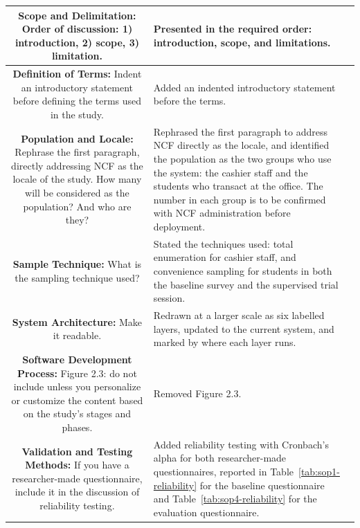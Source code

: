 \documentclass[12pt,letterpaper]{article}
\newcommand{\pg}[1]{\large #1}
\begin{document}
\begin{longtable}{|S|A|P|}
\textbf{Scope and Delimitation:}\newline
Order of discussion: 1) introduction, 2) scope, 3) limitation.
&
Presented in the required order: introduction, scope, and limitations.
&
\pg{\pageref{sec:scope}} \\ \hline

\textbf{Definition of Terms:}\newline
Indent an introductory statement before defining the terms used in the
study.
&
Added an indented introductory statement before the terms.
&
\pg{\pageref{cr:definitions}} \\ \hline

\textbf{Population and Locale:}\newline
Rephrase the first paragraph, directly addressing NCF as the locale of
the study. How many will be considered as the population? And who are
they?
&
Rephrased the first paragraph to address NCF directly as the locale, and
identified the population as the two groups who use the system: the
cashier staff and the students who transact at the office. The number
in each group is to be confirmed with NCF administration before
deployment.
&
\pg{\pageref{cr:population}} \\ \hline

\textbf{Sample Technique:}\newline
What is the sampling technique used?
&
Stated the techniques used: total enumeration for cashier staff,
and convenience sampling for students in both the
baseline survey and the supervised trial session.
&
\pg{\pageref{cr:sampling}} \\ \hline

\textbf{System Architecture:}\newline
Make it readable.
&
Redrawn at a larger scale as six labelled layers, updated to the current
system, and marked by where each layer runs.
&
\pg{\pageref{fig:system-architecture}} \\ \hline

\textbf{Software Development Process:}\newline
Figure 2.3: do not include unless you personalize or customize the
content based on the study's stages and phases.
&
Removed Figure 2.3.
&
\pg{\pageref{sec:sdp}} \\ \hline

\textbf{Validation and Testing Methods:}\newline
If you have a researcher-made questionnaire, include it in the
discussion of reliability testing.
&
Added reliability testing with Cronbach's alpha for both researcher-made
questionnaires, reported in Table~\ref{tab:sop1-reliability} for the
baseline questionnaire and Table~\ref{tab:sop4-reliability} for the
evaluation questionnaire.
&
\pg{\pageref{cr:validation}} \\ \hline


\end{longtable}
\end{document}
